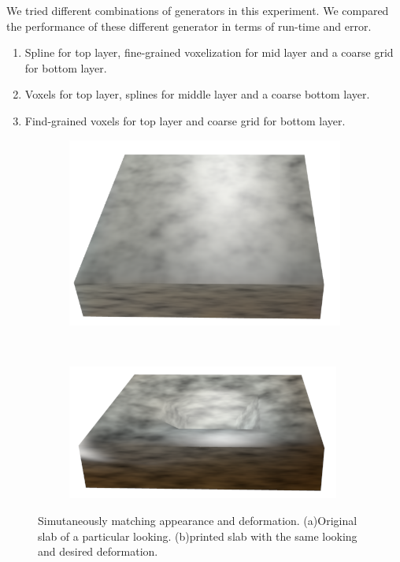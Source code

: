 \documentclass[annual]{acmsiggraph}
\begin{document}
We tried different combinations of generators in this experiment.
We compared the performance of these different generator
in terms of run-time and error.
\begin{enumerate}
\item Spline for top layer, fine-grained voxelization for mid layer
and a coarse grid for bottom layer.
\item Voxels for top layer, splines for middle layer and a coarse
bottom layer.
\item Find-grained voxels for top layer and coarse grid for bottom layer.
\end{enumerate}

\begin{figure}
\begin{subfigure}[b]{0.3\textwidth}
	\centering
 	\includegraphics[width=\textwidth]{figure/slab_origin.png}
   	\caption{}
    \label{fig:deformPhoto}
    \end{subfigure}
    ~ 
    \begin{subfigure}[b]{0.3\textwidth}
    \centering
  	\includegraphics[width=\textwidth]{figure/slab_deform.png}
    \caption{}
    \label{fig:deformPrint}
\end{subfigure}
\caption{Simutaneously matching appearance and deformation. 
(a)Original slab of a particular looking. (b)printed slab 
with the same looking and desired deformation.}
\label{fig:deform}
\end{figure}
\end{document}
